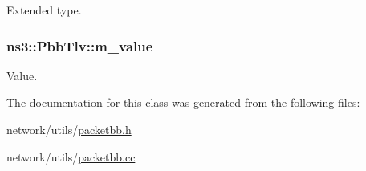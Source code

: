 Extended type. 

\subsubsection[{\texorpdfstring{m\+\_\+value}{m_value}}]{ ns3\+::\+Pbb\+Tlv\+::m\+\_\+value\hspace{0.3cm}{\ttfamily [private]}}\hypertarget{classns3_1_1PbbTlv_a5ec01aeec2b0987806b1304e24db9859}{}\label{classns3_1_1PbbTlv_a5ec01aeec2b0987806b1304e24db9859}


Value. 



The documentation for this class was generated from the following files\+:\begin{DoxyCompactItemize}
\item 
network/utils/\hyperlink{packetbb_8h}{packetbb.\+h}\item 
network/utils/\hyperlink{packetbb_8cc}{packetbb.\+cc}\end{DoxyCompactItemize}
